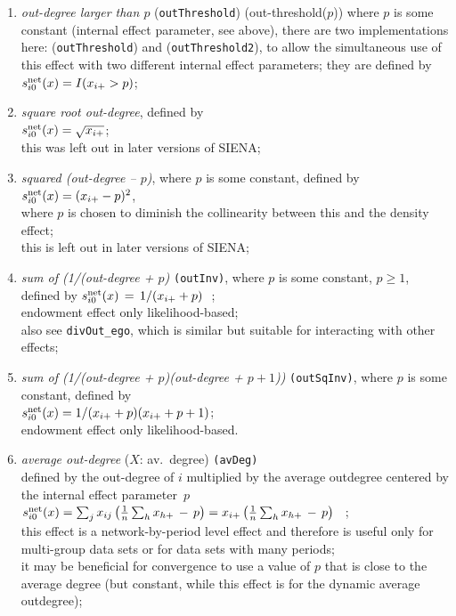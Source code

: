 \documentclass[a4paper,fleqn,11pt]{article}
\newcommand{\+}{\, + \,}
\newcommand{\si}{{\sf SIENA}}
\newcommand{\vit}{\theenumi}
\begin{document}
\begin{enumerate}
 \item {\em out-degree larger than $p$} (\texttt{outThreshold})
 (out-threshold($p$)) where $p$ is some constant
 (internal effect parameter, see above),
  there are two implementations here:
(\texttt{outThreshold}) and (\texttt{outThreshold2}),
 to allow the simultaneous use of this
 effect with two different internal effect parameters;
 they are defined by \\
 $s^{\rm net}_{i\vit}(x) = I(x_{i+} > p)$;\\

 \item {\em square root out-degree}, defined by  \\
 $s^{\rm net}_{i\vit}(x) = \sqrt{x_{i+}}$;\\
 this was left out in later versions of \si;

 \item {\em squared (out-degree -- $p$)}, where $p$ is some constant,
 defined by  \\
 $s^{\rm net}_{i\vit}(x) = (x_{i+} - p)^2$,\\
 where $p$ is chosen to diminish the collinearity between this
 and the density effect;\\
 this is left out in later versions of \si;

 \item {\em sum of (1/(out-degree + $p$)} \texttt{(outInv)},
 where $p$ is some constant, $ p \geq 1$,  defined by
$  s^{\rm net}_{i\vit}(x) \,=\,   1/(x_{i+} + p) \ $ ;\\
 endowment effect only likelihood-based;\\
 also see \texttt{divOut\_ego}, which is similar but
 suitable for interacting with other effects;

 \item {\em sum of (1/(out-degree + $p$)(out-degree + $p+1$))} \texttt{(outSqInv)},
 where $p$ is some constant, defined by  \\
 $s^{\rm net}_{i\vit}(x) = 1/(x_{i+} + p)(x_{i+} + p + 1)$;\\
 endowment effect only likelihood-based.

 \item {\em average out-degree} ($X$: av.\ degree) \texttt{(avDeg)}\\
 defined by the out-degree of $i$ multiplied by the
 average outdegree centered by the internal effect parameter~$p$\\[0.2em]
 $s^{\rm net}_{i\vit}(x) =  \sum_j x_{ij}\, \big( \frac 1n \sum_h  {x_{h+}} \,-\, p \big)=
                           x_{i+}\, \big( \frac 1n \sum_h x_{h+} \,-\, p \big) $ \, ;\\[0.2em]
  this effect is a network-by-period level effect and therefore is useful only
  for \\
  multi-group data sets or for data sets with many periods;\\
  it may be beneficial for convergence to use a value of $p$ that is
  close to the average degree (but constant, while this effect
  is for the dynamic average outdegree);


\end{enumerate}
\end{document}
